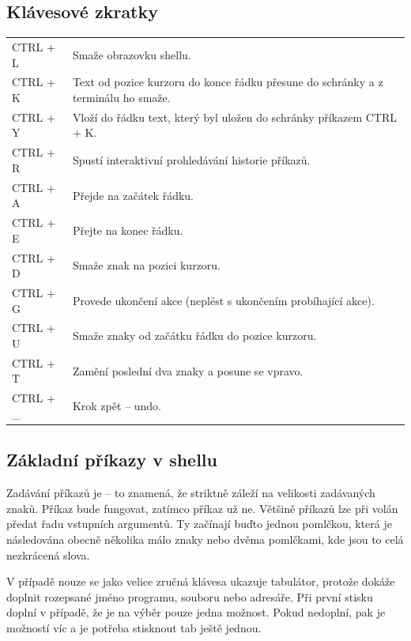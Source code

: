 \documentclass{article}
\begin{document}
\subsection{Klávesové zkratky}
\begin{tabular}{l p{12cm}}
CTRL + L & Smaže obrazovku shellu.\\
CTRL + K & Text od pozice kurzoru do konce řádku přesune do schránky a z terminálu ho smaže.\\
CTRL + Y & Vloží do řádku text, který byl uložen do schránky příkazem CTRL + K.\\
CTRL + R & Spustí interaktivní prohledávání historie příkazů.\\
CTRL + A & Přejde na začátek řádku.\\
CTRL + E & Přejte na konec řádku.\\
CTRL + D & Smaže znak na pozici kurzoru.\\
CTRL + G & Provede ukončení akce (neplést s ukončením probíhající akce).\\
CTRL + U & Smaže znaky od začátku řádku do pozice kurzoru.\\
CTRL + T & Zamění poslední dva znaky a posune se vpravo.\\
CTRL + \_ & Krok zpět -- undo.\\
\end{tabular}

\subsection{Základní příkazy v shellu}
Zadávání příkazů je  -- to znamená, že striktně záleží na velikosti zadávaných znaků. Příkaz  bude fungovat, zatímco příkaz  už ne. Většině příkazů lze při volán předat řadu vstupních argumentů. Ty začínají buďto jednou pomlčkou, která je následována obecně několika málo znaky nebo dvěma pomlčkami, kde jsou to celá nezkrácená slova. 

V případě nouze se jako velice zručná klávesa ukazuje tabulátor, protože dokáže doplnit rozepsané jméno programu, souboru nebo adresáře. Při první stisku doplní v případě, že je na výběr pouze jedna možnost. Pokud nedoplní, pak je možností víc a je potřeba stisknout tab ještě jednou.
\end{document}
